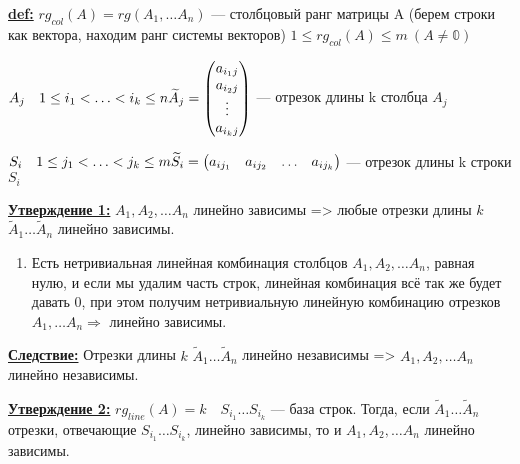 \textbf{\underline{def:}} $ rg_{col}(A) = rg(A_1, \ldots A_n)$ --- столбцовый ранг матрицы A (берем строки как вектора, находим ранг системы векторов) $ 1 \leq rg_{col}(A) \leq m \  (A \neq \mathbb{0})$

\( A_j \quad 1 \leq i_1 < \ldots <i_k \leq n \newline
\widetilde{A}_j =
\begin{pmatrix}
    a_{i_1j} \\
    a_{i_2j} \\
    \vdots   \\
    a_{i_kj}
\end{pmatrix}
\) --- отрезок длины k столбца $ A_j $

\( S_i \quad 1 \leq j_1 < \ldots < j_k \leq m \newline
\widetilde{S}_i =
\begin{pmatrix}
    a_{ij_1} & a_{ij_2} & \ldots & a_{ij_k}
\end{pmatrix}
\) --- отрезок длины k строки $ S_i $




\textbf{\underline{Утверждение 1:}} $ A_1, A_2, \ldots A_n $ линейно зависимы => любые отрезки длины $k$ $ \widetilde{A}_1 \ldots \widetilde{A}_n $ линейно зависимы.
\begin{enumerate}
    \item[] \prooff{}
          Есть нетривиальная линейная комбинация столбцов $ A_1, A_2, \ldots A_n $, равная нулю, и если мы удалим часть строк, линейная комбинация всё так же будет давать 0, при этом получим нетривиальную линейную комбинацию отрезков $A_1, \ldots A_n \Rightarrow$ линейно зависимы.
\end{enumerate}


\textbf{\underline{Следствие:}} Отрезки длины $k$ $ \widetilde{A}_1 \ldots \widetilde{A}_n $ линейно независимы => $ A_1, A_2, \ldots A_n $ линейно независимы.

\textbf{\underline{Утверждение 2:}}
\( rg_{line}(A) = k \quad S_{i_1} \ldots S_{i_k}\) --- база строк. Тогда, если $ \widetilde{A}_1 \ldots \widetilde{A}_n $ отрезки, отвечающие $ S_{i_1} \ldots S_{i_k} $, линейно зависимы, то и $ A_1, A_2, \ldots A_n $ линейно зависимы.

